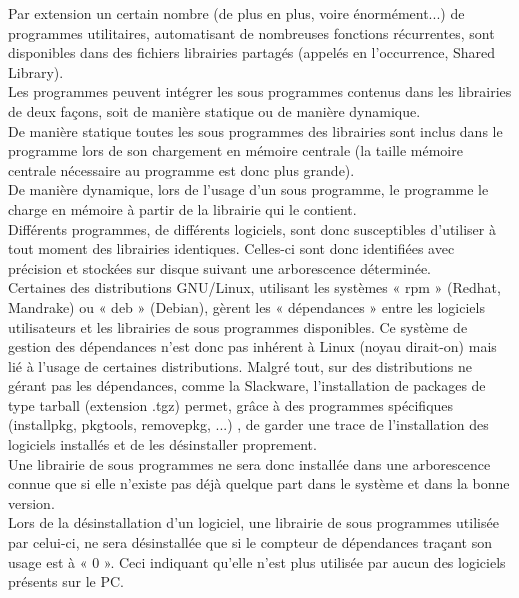 \documentclass[a4paper,12pt]{article}
\begin{document}
Par extension un certain nombre (de plus en plus, voire énormément...) de programmes utilitaires, automatisant de nombreuses fonctions récurrentes, 
sont disponibles dans des fichiers librairies partagés (appelés en l’occurrence, Shared Library).\\

Les programmes peuvent intégrer les sous programmes contenus dans les librairies de deux façons, soit de manière statique ou de manière dynamique.\\

De manière statique toutes les sous programmes des librairies sont inclus dans le programme lors de son chargement en mémoire centrale 
(la taille mémoire centrale nécessaire au programme est donc plus grande).\\

De manière dynamique, lors de l’usage d’un sous programme, le programme le charge en mémoire à partir de la librairie qui le contient.\\

Différents programmes, de différents logiciels, sont donc susceptibles d’utiliser à tout moment des librairies identiques. 
Celles-ci sont donc identifiées avec précision  et stockées sur disque suivant une arborescence déterminée.\\

Certaines des distributions GNU/Linux, utilisant les systèmes « rpm » (Redhat, Mandrake) ou « deb » (Debian), gèrent 
les « dépendances » entre les logiciels utilisateurs et les librairies de sous programmes disponibles. 
Ce système de gestion des dépendances n’est donc pas inhérent à Linux (noyau dirait-on) mais lié à l’usage de certaines distributions. 
Malgré tout, sur des distributions ne gérant pas les dépendances, comme la Slackware, l’installation de packages de type tarball (extension .tgz)
permet, grâce à des programmes spécifiques (installpkg, pkgtools, removepkg, ...) , de garder une trace de l’installation des logiciels installés 
et de les désinstaller proprement.\\

Une librairie de sous programmes ne sera donc installée dans une arborescence connue que si elle n’existe pas déjà quelque part dans le système et dans la bonne version.\\

Lors de la désinstallation d’un logiciel, une librairie de sous programmes utilisée par celui-ci, ne sera désinstallée que si le compteur de 
dépendances traçant son usage est à « 0 ». Ceci indiquant qu’elle n’est plus utilisée par aucun des logiciels présents sur le PC.\\
\end{document}
